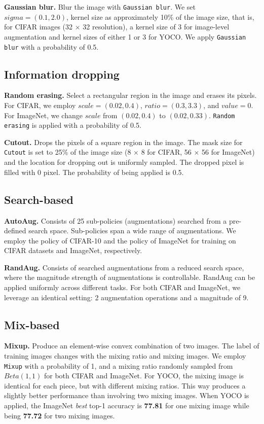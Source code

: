\documentclass{article}
\begin{document}
\textbf{Gaussian blur.} 
Blur the image with \texttt{Gaussian blur}. We set $sigma=(0.1, 2.0)$, kernel size as approximately 10\% of the image size, that is, for CIFAR images (32 $\times$ 32 resolution), a kernel size of 3 for image-level augmentation and kernel sizes of either 1 or 3 for YOCO. We apply \texttt{Gaussian blur} with a probability of 0.5.

\subsection{Information dropping}

\textbf{Random erasing.} 
Select a rectangular region in the image and erases its pixels. For CIFAR, we employ $scale=(0.02, 0.4)$, $ratio=(0.3, 3.3)$, and $value=0$. For ImageNet, we change $scale$ from $(0.02, 0.4)$ to $(0.02, 0.33)$. \texttt{Random erasing} is applied with a probability of 0.5.

\textbf{Cutout.} 
Drops the pixels of a square region in the image. The mask size for \texttt{Cutout} is set to 25\% of the image size (8 $\times$ 8 for CIFAR, 56 $\times$ 56 for ImageNet) and the location for dropping out is uniformly sampled. The dropped pixel is filled with 0 pixel. The probability of being applied is 0.5.

\subsection{Search-based}

\textbf{AutoAug.} 
Consists of 25 sub-policies (augmentations) searched from a pre-defined search space. Sub-policies span a wide range of augmentations. We employ the policy of CIFAR-10 and the policy of ImageNet for training on CIFAR datasets and ImageNet, respectively.

\textbf{RandAug.} 
Consists of searched augmentations from a reduced search space, where the magnitude strength of augmentations is controllable. RandAug can be applied uniformly across different tasks. For both CIFAR and ImageNet, we leverage an identical setting: 2 augmentation operations and a magnitude of 9. 

\subsection{Mix-based}

\textbf{Mixup.} 
Produce an element-wise convex combination of two images. The label of training images changes with the mixing ratio and mixing images. We employ \texttt{Mixup} with a probability of 1, and a mixing ratio randomly sampled from $Beta(1, 1)$ for both CIFAR and ImageNet. For YOCO, the mixing image is identical for each piece, but with different mixing ratios. This way produces a slightly better performance than involving two mixing images. When YOCO is applied, the ImageNet \textit{best} top-1 accuracy is \textbf{77.81} for one mixing image while being \textbf{77.72} for two mixing images. 
\end{document}
